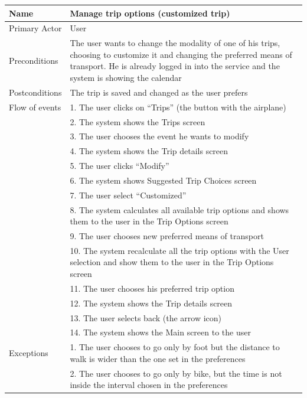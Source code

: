 \begin{center}
\def\arraystretch{1.25}
  \begin{tabular}{ | l | p{} | }
    \hline
    Name & Manage trip options (customized trip) \\ \hline
    Primary Actor & User \\ \hline
    Preconditions & The user wants to change the modality of one of his trips, choosing to customize it and changing the preferred means of transport. He is already logged in into the service and the system is showing the calendar \\ \hline
    Postconditions & The trip is saved and changed as the user prefers \\ \hline
    Flow of events  & 1.	The user clicks on “Trips” (the button with the airplane) \\
					& 2.	The system shows the Trips screen \\
					& 3.	The user chooses the event he wants to modify \\
					& 4.	The system shows the Trip details screen \\
					& 5.	The user clicks “Modify” \\
					& 6.	The system shows Suggested Trip Choices screen \\
					& 7.	The user select “Customized” \\
					& 8.	The system calculates all available trip options and shows them to the user in the Trip Options screen \\
					& 9.	The user chooses new preferred means of transport \\
					& 10.	The system recalculate all the trip options with the User selection and show them to the user in the Trip Options screen \\
					& 11.	The user chooses his preferred trip option \\
					& 12.	The system shows the Trip details screen \\
					& 13.	The user selects back (the arrow icon) \\
					& 14.	The system shows the Main screen to the user
\\
 \hline
    Exceptions  & 1.	The user chooses to go only by foot but the distance to walk is wider than the one set in the preferences \\
				& 2.	The user chooses to go only by bike, but the time is not inside the interval chosen in the preferences
 \\
 \hline
  \end{tabular}
\end{center}

